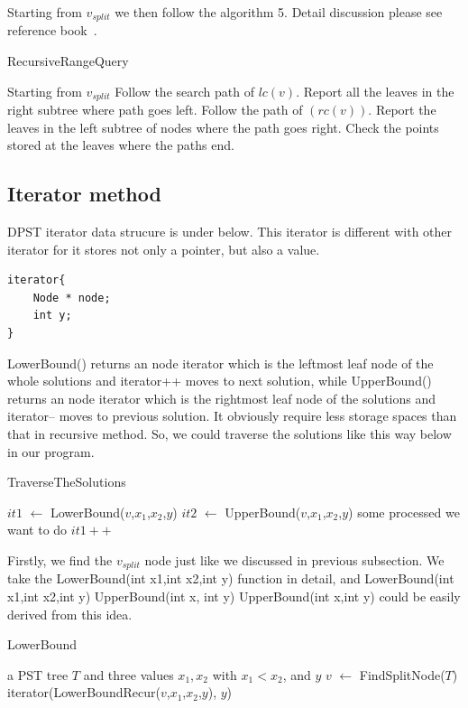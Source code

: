 \documentclass{acm_proc_article-sp}
\newcommand{\RETURN}{\STATE {\bf return} }
\begin{document}
Starting from $v_{split}$ we then follow the algorithm 5. Detail
discussion please see reference book~\cite{CG_02}.
\begin{algorithm}[!h]
\caption{RecursiveRangeQuery} \label{alg:recursive
method}
    \begin{algorithmic}[1]
    \STATE Starting from $v_{split}$
    \STATE Follow the search path of $lc(v)$. Report all the
leaves in the right subtree where path goes left.
    \STATE Follow the path of $(rc(v))$. Report the leaves in the left subtree of nodes where the path goes right.
    \STATE Check the points stored at the leaves where the paths end.
    \end{algorithmic}
\end{algorithm}


\subsection{Iterator method}
DPST iterator data strucure is under below. This iterator is different 
with other iterator for it stores not only a pointer, but also a value.\\
\begin{verbatim}
iterator{
    Node * node;
    int y;
}
\end{verbatim}
LowerBound() returns an node iterator which
is the leftmost leaf node of the whole solutions and iterator++
moves to next solution, while UpperBound() returns an node
iterator which is the rightmost leaf node of the solutions and
iterator-- moves to previous solution. It obviously require less
storage spaces than that in recursive method. So, we could traverse
the solutions like this way below in our program.
\begin{algorithm}[!h]
\caption{TraverseTheSolutions} \label{alg:traversing}
	\begin{algorithmic}[1]
	\STATE $it1$ $\leftarrow$ LowerBound($v$,$x_1$,$x_2$,$y$)
	\STATE $it2$ $\leftarrow$ UpperBound($v$,$x_1$,$x_2$,$y$)
	\REPEAT
	\STATE some processed we want to do
	\STATE $it1++$
	\end{algorithmic}
\end{algorithm}
Firstly, we find the $v_{split}$ node just like we discussed in
previous subsection. We take the LowerBound(int x1,int x2,int y)
function in detail, and LowerBound(int x1,int x2,int y)
UpperBound(int x, int y) UpperBound(int x,int y) could be easily
derived from this idea.
\begin{algorithm}[!h]
\caption{LowerBound} \label{alg:find lowerbound}
    \begin{algorithmic}[1]
    \REQUIRE a PST tree $T$ and three values $x_1,x_2$ with
$x_1<x_2$, and $y$
    \STATE $v$ $\leftarrow$ FindSplitNode($T$)
    \RETURN iterator(LowerBoundRecur($v$,$x_1$,$x_2$,$y$), $y$)
    \end{algorithmic}
\end{algorithm}
\end{document}
